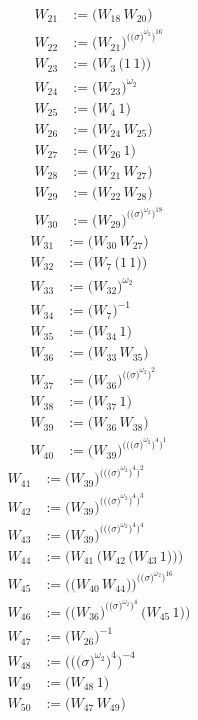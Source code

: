 \begin{align*}
W_{21} &:= \bigl(W_{18}\,W_{20}\bigr) \\
W_{22} &:= \bigl(W_{21}\bigr)^{\bigl(\bigl(\sigma\bigr)^{\omega_2}\bigr)^{16}} \\
W_{23} &:= \bigl(W_{3}\,\bigl(1\,1\bigr)\bigr) \\
W_{24} &:= \bigl(W_{23}\bigr)^{\omega_2} \\
W_{25} &:= \bigl(W_{4}\,1\bigr) \\
W_{26} &:= \bigl(W_{24}\,W_{25}\bigr) \\
W_{27} &:= \bigl(W_{26}\,1\bigr) \\
W_{28} &:= \bigl(W_{21}\,W_{27}\bigr) \\
W_{29} &:= \bigl(W_{22}\,W_{28}\bigr) \\
W_{30} &:= \bigl(W_{29}\bigr)^{\bigl(\bigl(\sigma\bigr)^{\omega_2}\bigr)^{18}}
\end{align*}
\begin{align*}
W_{31} &:= \bigl(W_{30}\,W_{27}\bigr) \\
W_{32} &:= \bigl(W_{7}\,\bigl(1\,1\bigr)\bigr) \\
W_{33} &:= \bigl(W_{32}\bigr)^{\omega_2} \\
W_{34} &:= \bigl(W_{7}\bigr)^{-1} \\
W_{35} &:= \bigl(W_{34}\,1\bigr) \\
W_{36} &:= \bigl(W_{33}\,W_{35}\bigr) \\
W_{37} &:= \bigl(W_{36}\bigr)^{\bigl(\bigl(\sigma\bigr)^{\omega_2}\bigr)^{2}} \\
W_{38} &:= \bigl(W_{37}\,1\bigr) \\
W_{39} &:= \bigl(W_{36}\,W_{38}\bigr) \\
W_{40} &:= \bigl(W_{39}\bigr)^{\bigl(\bigl(\bigl(\sigma\bigr)^{\omega_2}\bigr)^{4}\bigr)^{1}}
\end{align*}
\begin{align*}
W_{41} &:= \bigl(W_{39}\bigr)^{\bigl(\bigl(\bigl(\sigma\bigr)^{\omega_2}\bigr)^{4}\bigr)^{2}} \\
W_{42} &:= \bigl(W_{39}\bigr)^{\bigl(\bigl(\bigl(\sigma\bigr)^{\omega_2}\bigr)^{4}\bigr)^{3}} \\
W_{43} &:= \bigl(W_{39}\bigr)^{\bigl(\bigl(\bigl(\sigma\bigr)^{\omega_2}\bigr)^{4}\bigr)^{4}} \\
W_{44} &:= \bigl(W_{41}\,\bigl(W_{42}\,\bigl(W_{43}\,1\bigr)\bigr)\bigr) \\
W_{45} &:= \bigl(\bigl(W_{40}\,W_{44}\bigr)\bigr)^{\bigl(\bigl(\sigma\bigr)^{\omega_2}\bigr)^{16}} \\
W_{46} &:= \bigl(\bigl(W_{36}\bigr)^{\bigl(\bigl(\sigma\bigr)^{\omega_2}\bigr)^{4}}\,\bigl(W_{45}\,1\bigr)\bigr) \\
W_{47} &:= \bigl(W_{26}\bigr)^{-1} \\
W_{48} &:= \bigl(\bigl(\bigl(\sigma\bigr)^{\omega_2}\bigr)^{4}\bigr)^{-4} \\
W_{49} &:= \bigl(W_{48}\,1\bigr) \\
W_{50} &:= \bigl(W_{47}\,W_{49}\bigr)
\end{align*}
